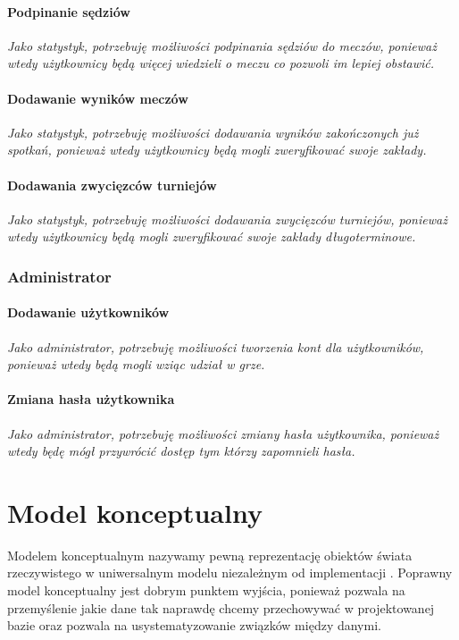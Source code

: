 \documentclass{mwrep}
\begin{document}
\subsubsection{Podpinanie sędziów}
\emph{Jako statystyk, potrzebuję możliwości podpinania sędziów do meczów, ponieważ wtedy użytkownicy będą więcej wiedzieli o meczu co pozwoli im lepiej obstawić.}

\subsubsection{Dodawanie wyników meczów}
\emph{Jako statystyk, potrzebuję możliwości dodawania wyników zakończonych już spotkań, ponieważ wtedy użytkownicy będą mogli zweryfikować swoje zakłady.}

\subsubsection{Dodawania zwycięzców turniejów}
\emph{Jako statystyk, potrzebuję możliwości dodawania zwycięzców turniejów, ponieważ wtedy użytkownicy będą mogli zweryfikować swoje zakłady długoterminowe.}


\subsection{Administrator}
\subsubsection{Dodawanie użytkowników}
\emph{Jako administrator, potrzebuję możliwości tworzenia kont dla użytkowników, ponieważ wtedy będą mogli wziąc udział w grze.}

\subsubsection{Zmiana hasła użytkownika}
\emph{Jako administrator, potrzebuję możliwości zmiany hasła użytkownika, ponieważ wtedy będę mógł przywrócić dostęp tym którzy zapomnieli hasła.}


\chapter{Model konceptualny}
Modelem konceptualnym nazywamy pewną reprezentację obiektów świata rzeczywistego 
w uniwersalnym modelu niezależnym od implementacji \cite{Wrembel1}. Poprawny model 
konceptualny jest dobrym punktem wyjścia, ponieważ pozwala na przemyślenie jakie
dane tak naprawdę chcemy przechowywać w projektowanej bazie oraz pozwala na usystematyzowanie
związków między danymi.
\end{document}
